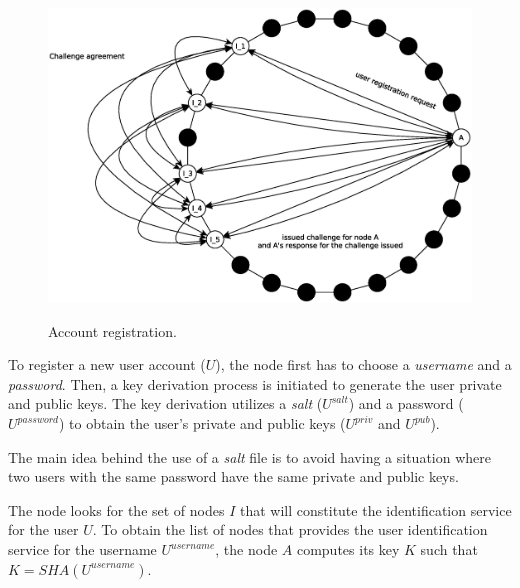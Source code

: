 \begin{figure}[!htb]
\centering
\includegraphics[width=14cm]{../img/sign_up}\\
\caption{Account registration.}
\label{fig:sign_up}
\end{figure}

To register a new user account ($U$), the node first
has to choose a \textit{username} and a \textit{password}.
Then, a key derivation process is initiated to generate the user private and
public keys. The key derivation utilizes a \textit{salt} ($U^{salt}$) and a password ($U^{password}$) to
obtain the user's private and public keys ($U^{priv}$ and $U^{pub}$).
% 
% 

The main idea behind the use of a \textit{salt} file is to avoid having a
situation where two users with the same password have the same private and
public keys.

The node  looks for the set of nodes $I$ that will constitute the
identification service for the user $U$. To obtain the list of nodes that provides the user identification service for
the username $U^{username}$, the node $A$ computes its key $K$ such that $K =
SHA(U^{username})$. 

